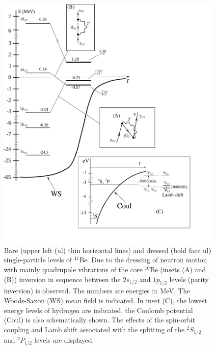    \begin{figure}
   \centerline{\includegraphics*[width=12cm,angle=0]{C8/figsC8/Fig6_2_1}}
   	\caption{Bare (upper left (ul) thin horizontal lines) and dressed (bold face ul)
   	single-particle levels of $^{11}$Be. Due to the dressing of neutron motion with mainly quadrupole vibrations
   	of the core $^{10}$Be (insets (A) and (B)) inversion in sequence between the 
   	$ 2s_{1/2}$ and $ 1p_{1/2}$ levels  (parity inversion) is observed. The numbers 
   	are   energies in MeV. The Woods-Saxon (WS) mean field is indicated.
   	In inset (C), the lowest energy levels of hydrogen 
   	are indicated, the Coulomb potential (Coul) is also schematically shown.
   	The effects of the spin-orbit coupling and Lamb shift associated with the splitting of the 
   	$^2S_{1/2}$ and $^2P_{1/2}$ levels are displayed.}\label{fig6.2.1x}
   \end{figure}

